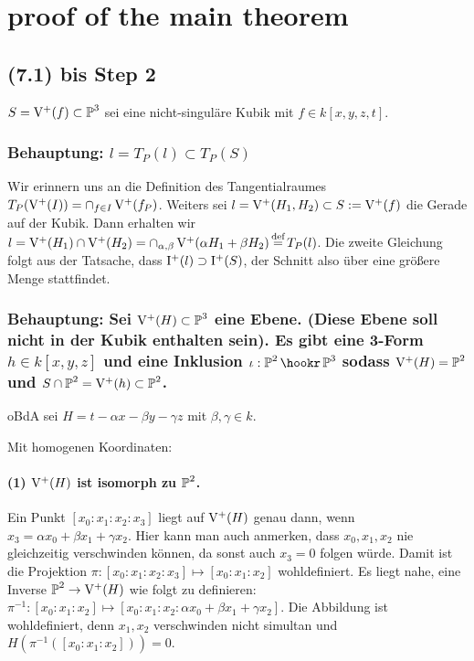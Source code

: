 \section{proof of the main theorem}



\subsection{(7.1) bis Step 2}
$S = \operatorname{V^+}(f) \subset \operatorname{\mathbb P}^3$ sei eine nicht-singuläre Kubik mit $f \in k[x,y,z,t]$.

\subsubsection{ %
Behauptung: $l =  T_P(l) \subset T_P(S)$
} %

Wir erinnern uns an die Definition des Tangentialraumes $T_P(\operatorname{V^+}(I)) = \cap_{f\in I} \operatorname{V^+}(f_P)$.
Weiters sei $l = \operatorname{V^+}(H_1, H_2) \subset S := \operatorname{V^+}(f)$ die Gerade auf der Kubik.
Dann erhalten wir $l = \operatorname{V^+}(H_1) \cap \operatorname{V^+}(H_2) = \cap_{\alpha, \beta} \operatorname{V^+}(\alpha H_1 + \beta H_2) \operatorname{\overset{\text{def}}=}  T_P(l)$.
Die zweite Gleichung folgt aus der Tatsache, dass $\operatorname{I^+}(l) \supset \operatorname{I^+}(S)$, der Schnitt also über eine größere Menge stattfindet.


\subsubsection{%
Behauptung: Sei $\operatorname{V^+}(H) \subset \operatorname{\mathbb P}^3$ eine Ebene.
(Diese Ebene soll nicht in der Kubik enthalten sein).
Es gibt eine 3-Form $h \in k[x,y,z]$ und eine Inklusion $\iota : \proj^2 \hookr \proj^3$ sodass $\operatorname{V^+}(H) = \operatorname{\mathbb P}^2$ und $S\cap \operatorname{\mathbb P}^2 = \operatorname{V^+}(h) \subset \operatorname{\mathbb P}^2$.
} %

oBdA sei $H = t - \alpha x -  \beta y - \gamma z$ mit $\beta, \gamma \in k$.

Mit homogenen Koordinaten:
\paragraph{(1) $\operatorname{V^+}(H)$ ist isomorph zu $\operatorname{\mathbb P}^2$.}
Ein Punkt $[x_0:x_1:x_2:x_3]$ liegt auf $\operatorname{V^+}(H)$ genau dann, wenn $x_3 = \alpha x_0 + \beta x_1 + \gamma x_2$.
Hier kann man auch anmerken, dass $x_0,x_1,x_2$ nie gleichzeitig verschwinden können, da sonst auch $x_3 = 0$ folgen würde.
Damit ist die Projektion $\pi : [x_0:x_1:x_2:x_3] \mapsto [x_0:x_1:x_2]$ wohldefiniert.
Es liegt nahe, eine Inverse $\operatorname{\mathbb P}^2 \to \operatorname{V^+}(H)$ wie folgt zu definieren:
$\pi^{-1} : [x_0:x_1:x_2] \mapsto [x_0 : x_1 : x_2 : \alpha x_0 + \beta x_1 + \gamma x_2]$.
Die Abbildung ist wohldefiniert, denn $x_1,x_2$ verschwinden nicht simultan und $H(\pi^{-1}([x_0:x_1:x_2])) = 0$.

